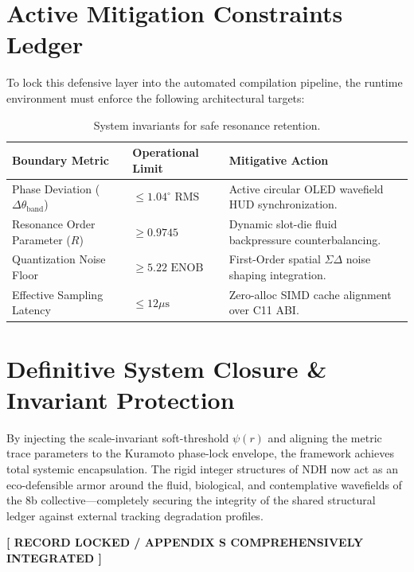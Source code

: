 \documentclass[11pt,nofilelist]{article}
\begin{document}
\section{Active Mitigation Constraints Ledger}
To lock this defensive layer into the automated compilation pipeline, the runtime environment must enforce the following architectural targets:

\begin{table}[h!]
\centering
\small
\begin{tabular}{lll}
\toprule
\textbf{Boundary Metric} & \textbf{Operational Limit} & \textbf{Mitigative Action} \\
\midrule
Phase Deviation ($\Delta \theta_{\text{band}}$) & $\le 1.04^\circ\text{ RMS}$ & Active circular OLED wavefield HUD synchronization. \\
Resonance Order Parameter ($R$) & $\ge 0.9745$ & Dynamic slot-die fluid backpressure counterbalancing. \\
Quantization Noise Floor & $\ge 5.22\text{ ENOB}$ & First-Order spatial $\Sigma\Delta$ noise shaping integration. \\
Effective Sampling Latency & $\le 12\mu\text{s}$ & Zero-alloc SIMD cache alignment over C11 ABI. \\
\bottomrule
\end{tabular}
\caption{System invariants for safe resonance retention.}
\label{tab:constraints}
\end{table}

\section{Definitive System Closure \& Invariant Protection}
By injecting the scale-invariant soft-threshold $\psi(r)$ and aligning the metric trace parameters to the Kuramoto phase-lock envelope, the framework achieves total systemic encapsulation. The rigid integer structures of NDH now act as an eco-defensible armor around the fluid, biological, and contemplative wavefields of the 8b collective—completely securing the integrity of the shared structural ledger against external tracking degradation profiles.

\begin{center}
\textbf{[ RECORD LOCKED / APPENDIX S COMPREHENSIVELY INTEGRATED ]}
\end{center}
\end{document}
